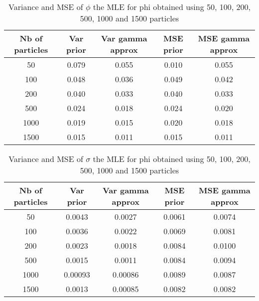 \documentclass{article}
\begin{document}
	\begin{table}[htb]
		\centering
		\vspace{5mm}
		\begin{tabular}{c|c|c|c|c}
			Nb of particles & Var prior &  Var gamma approx & MSE prior & MSE gamma approx \\ \hline
			50 & 0.079 & 0.055 & 0.010 & 0.055\\ \hline
			100 & 0.048 & 0.036 & 0.049 & 0.042\\ \hline
			200 & 0.040 & 0.033 & 0.040 & 0.033\\ \hline
			500 & 0.024 & 0.018 & 0.024 & 0.020\\ \hline
			1000 & 0.019 & 0.015 & 0.020 & 0.018\\ \hline
			1500 & 0.015 & 0.011 & 0.015 & 0.011 \\ \hline
		\end{tabular}
		\caption{Variance and MSE of $\phi$ the MLE for phi obtained using 50, 100, 200, 500, 1000 and 1500 particles}
		\label{table:mlephi}
		\vspace{5mm}
	\end{table}

	\begin{table}[htb]
		\centering
		\vspace{5mm}
		\begin{tabular}{c|c|c|c|c}
			Nb of particles & Var prior &  Var gamma approx & MSE prior & MSE gamma approx \\ \hline
			50 & 0.0043 & 0.0027 & 0.0061 & 0.0074\\ \hline
			100 & 0.0036 & 0.0022 & 0.0069 & 0.0081\\ \hline
			200 & 0.0023 & 0.0018 & 0.0084 & 0.0100\\ \hline
			500 & 0.0015 & 0.0011 & 0.0084 & 0.0094\\ \hline
			1000 & 0.00093 & 0.00086 & 0.0089 & 0.0087\\ \hline
			1500 & 0.0013 & 0.00085 & 0.0082 & 0.0082 \\ \hline
		\end{tabular}
		\caption{Variance and MSE of $\sigma$ the MLE for phi obtained using 50, 100, 200, 500, 1000 and 1500 particles}
		\label{table:mlesigma}
		\vspace{5mm}
	\end{table}
\end{document}
